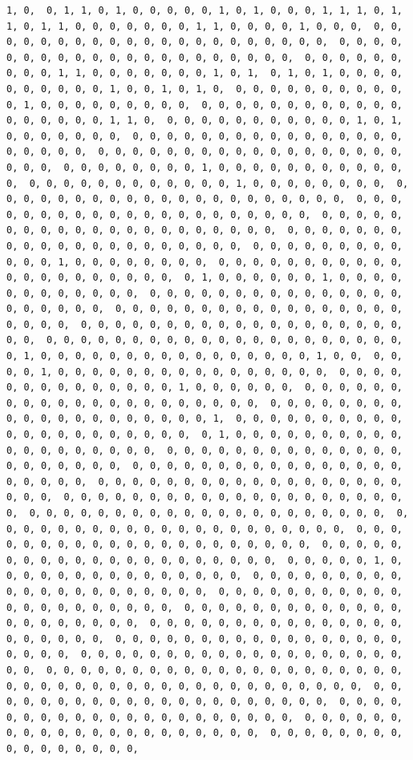 \documentclass[
]{article}
\begin{document}
\begin{verbatim}
1, 0,  0, 1, 1, 0, 1, 0, 0, 0, 0, 0, 1, 0, 1, 0, 0, 0, 1, 1, 1, 0, 1,  1, 0, 1, 1, 0, 0, 0, 0, 0, 0, 0, 1, 1, 0, 0, 0, 0, 1, 0, 0, 0,  0, 0, 0, 0, 0, 0, 0, 0, 0, 0, 0, 0, 0, 0, 0, 0, 0, 0, 0, 0, 0,  0, 0, 0, 0, 0, 0, 0, 0, 0, 0, 0, 0, 0, 0, 0, 0, 0, 0, 0, 0, 0,  0, 0, 0, 0, 0, 0, 0, 0, 0, 1, 1, 0, 0, 0, 0, 0, 0, 0, 1, 0, 1,  0, 1, 0, 1, 0, 0, 0, 0, 0, 0, 0, 0, 0, 0, 1, 0, 0, 1, 0, 1, 0,  0, 0, 0, 0, 0, 0, 0, 0, 0, 0, 0, 1, 0, 0, 0, 0, 0, 0, 0, 0, 0,  0, 0, 0, 0, 0, 0, 0, 0, 0, 0, 0, 0, 0, 0, 0, 0, 0, 0, 1, 1, 0,  0, 0, 0, 0, 0, 0, 0, 0, 0, 0, 0, 1, 0, 1, 0, 0, 0, 0, 0, 0, 0,  0, 0, 0, 0, 0, 0, 0, 0, 0, 0, 0, 0, 0, 0, 0, 0, 0, 0, 0, 0, 0,  0, 0, 0, 0, 0, 0, 0, 0, 0, 0, 0, 0, 0, 0, 0, 0, 0, 0, 0, 0, 0,  0, 0, 0, 0, 0, 0, 0, 0, 1, 0, 0, 0, 0, 0, 0, 0, 0, 0, 0, 0, 0,  0, 0, 0, 0, 0, 0, 0, 0, 0, 0, 0, 0, 1, 0, 0, 0, 0, 0, 0, 0, 0,  0, 0, 0, 0, 0, 0, 0, 0, 0, 0, 0, 0, 0, 0, 0, 0, 0, 0, 0, 0, 0,  0, 0, 0, 0, 0, 0, 0, 0, 0, 0, 0, 0, 0, 0, 0, 0, 0, 0, 0, 0, 0,  0, 0, 0, 0, 0, 0, 0, 0, 0, 0, 0, 0, 0, 0, 0, 0, 0, 0, 0, 0, 0,  0, 0, 0, 0, 0, 0, 0, 0, 0, 0, 0, 0, 0, 0, 0, 0, 0, 0, 0, 0, 0,  0, 0, 0, 0, 0, 0, 0, 0, 0, 0, 0, 0, 1, 0, 0, 0, 0, 0, 0, 0, 0,  0, 0, 0, 0, 0, 0, 0, 0, 0, 0, 0, 0, 0, 0, 0, 0, 0, 0, 0, 0, 0,  0, 1, 0, 0, 0, 0, 0, 0, 1, 0, 0, 0, 0, 0, 0, 0, 0, 0, 0, 0, 0,  0, 0, 0, 0, 0, 0, 0, 0, 0, 0, 0, 0, 0, 0, 0, 0, 0, 0, 0, 0, 0,  0, 0, 0, 0, 0, 0, 0, 0, 0, 0, 0, 0, 0, 0, 0, 0, 0, 0, 0, 0, 0,  0, 0, 0, 0, 0, 0, 0, 0, 0, 0, 0, 0, 0, 0, 0, 0, 0, 0, 0, 0, 0,  0, 0, 0, 0, 0, 0, 0, 0, 0, 0, 0, 0, 0, 0, 0, 0, 0, 0, 0, 0, 0,  0, 1, 0, 0, 0, 0, 0, 0, 0, 0, 0, 0, 0, 0, 0, 0, 0, 0, 1, 0, 0,  0, 0, 0, 0, 1, 0, 0, 0, 0, 0, 0, 0, 0, 0, 0, 0, 0, 0, 0, 0, 0,  0, 0, 0, 0, 0, 0, 0, 0, 0, 0, 0, 0, 0, 0, 1, 0, 0, 0, 0, 0, 0,  0, 0, 0, 0, 0, 0, 0, 0, 0, 0, 0, 0, 0, 0, 0, 0, 0, 0, 0, 0, 0,  0, 0, 0, 0, 0, 0, 0, 0, 0, 0, 0, 0, 0, 0, 0, 0, 0, 0, 0, 0, 1,  0, 0, 0, 0, 0, 0, 0, 0, 0, 0, 0, 0, 0, 0, 0, 0, 0, 0, 0, 0, 0,  0, 1, 0, 0, 0, 0, 0, 0, 0, 0, 0, 0, 0, 0, 0, 0, 0, 0, 0, 0, 0,  0, 0, 0, 0, 0, 0, 0, 0, 0, 0, 0, 0, 0, 0, 0, 0, 0, 0, 0, 0, 0,  0, 0, 0, 0, 0, 0, 0, 0, 0, 0, 0, 0, 0, 0, 0, 0, 0, 0, 0, 0, 0,  0, 0, 0, 0, 0, 0, 0, 0, 0, 0, 0, 0, 0, 0, 0, 0, 0, 0, 0, 0, 0,  0, 0, 0, 0, 0, 0, 0, 0, 0, 0, 0, 0, 0, 0, 0, 0, 0, 0, 0, 0, 0,  0, 0, 0, 0, 0, 0, 0, 0, 0, 0, 0, 0, 0, 0, 0, 0, 0, 0, 0, 0, 0,  0, 0, 0, 0, 0, 0, 0, 0, 0, 0, 0, 0, 0, 0, 0, 0, 0, 0, 0, 0, 0,  0, 0, 0, 0, 0, 0, 0, 0, 0, 0, 0, 0, 0, 0, 0, 0, 0, 0, 0, 0, 0,  0, 0, 0, 0, 0, 0, 0, 0, 0, 0, 0, 0, 0, 0, 0, 0, 0, 0, 0, 0, 0,  0, 0, 0, 0, 0, 1, 0, 0, 0, 0, 0, 0, 0, 0, 0, 0, 0, 0, 0, 0, 0,  0, 0, 0, 0, 0, 0, 0, 0, 0, 0, 0, 0, 0, 0, 0, 0, 0, 0, 0, 0, 0,  0, 0, 0, 0, 0, 0, 0, 0, 0, 0, 0, 0, 0, 0, 0, 0, 0, 0, 0, 0, 0,  0, 0, 0, 0, 0, 0, 0, 0, 0, 0, 0, 0, 0, 0, 0, 0, 0, 0, 0, 0, 0,  0, 0, 0, 0, 0, 0, 0, 0, 0, 0, 0, 0, 0, 0, 0, 0, 0, 0, 0, 0, 0,  0, 0, 0, 0, 0, 0, 0, 0, 0, 0, 0, 0, 0, 0, 0, 0, 0, 0, 0, 0, 0,  0, 0, 0, 0, 0, 0, 0, 0, 0, 0, 0, 0, 0, 0, 0, 0, 0, 0, 0, 0, 0,  0, 0, 0, 0, 0, 0, 0, 0, 0, 0, 0, 0, 0, 0, 0, 0, 0, 0, 0, 0, 0,  0, 0, 0, 0, 0, 0, 0, 0, 0, 0, 0, 0, 0, 0, 0, 0, 0, 0, 0, 0, 0,  0, 0, 0, 0, 0, 0, 0, 0, 0, 0, 0, 0, 0, 0, 0, 0, 0, 0, 0, 0, 0,  0, 0, 0, 0, 0, 0, 0, 0, 0, 0, 0, 0, 0, 0, 0, 0, 0, 0, 0, 0, 0,  0, 0, 0, 0, 0, 0, 0, 0, 0, 0, 0, 0, 0, 0, 0, 0, 0, 0, 0, 0, 0,  0, 0, 0, 0, 0, 0, 0, 0, 0, 0, 0, 0, 0, 0, 0, 0, 
\end{verbatim}
\end{document}
